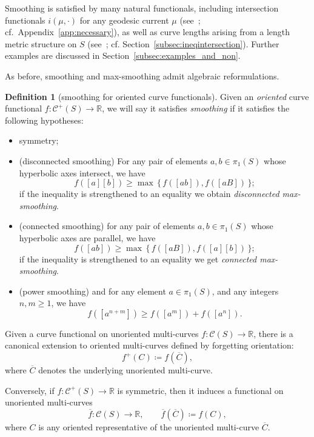 \documentclass[11pt]{amsart}
\numberwithin{equation}{section}
\numberwithin{figure}{section}
\theoremstyle{definition}
\newtheorem{definition}[theorem]{Definition}
\theoremstyle{plain}
\newcommand{\Curves}{\mathcal{C}}
\begin{document}
Smoothing is satisfied by many natural functionals, including
intersection functionals $i(\mu,\cdot)$ for any geodesic current $\mu$
(see~\cite[Section~4.1]{MGT21:Smoothings}; cf.~Appendix~\ref{app:necessary}),
as well as curve lengths arising from a length metric structure on $S$
(see~\cite[Section~4.3]{MGT21:Smoothings}; cf. Section~\ref{subsec:ineqintersection}).
Further examples are discussed in Section~\ref{subsec:examples_and_non}.

As before, smoothing and max-smoothing admit algebraic reformulations.

\begin{definition}[smoothing for oriented curve functionals]
 Given an \emph{oriented} curve functional $f \colon \Curves^+(S) \to \mathbb{R}$, we will say it satisfies \emph{smoothing} if it satisfies the following hypotheses:
\begin{itemize}
\item symmetry;
\item (disconnected smoothing) For any pair of
  elements $a,b \in \pi_1(S)$ whose hyperbolic axes intersect, we have 
  \[ f([a] [b]) \geq \max\,\{\,f([ab]), f([aB])\,\}; \] if the inequality is
  strengthened to an equality we obtain \emph{disconnected max-smoothing}.
\item (connected smoothing) for any pair of elements $a,b \in
  \pi_1(S)$ whose hyperbolic axes are parallel, we have
  \[ f([ab]) \geq \max\,\{\,f([aB]), f([a] [b])\,\}; \]
  if the inequality is
  strengthened to an equality we get \emph{connected max-smoothing}.
 \item (power smoothing) and for any element $a \in \pi_1(S)$, and any
  integers $n,m\geq 1$, we have \begin{equation} f([a^{n+m}]) \geq f([a^{ m}]) +
  f([a^{ n}]).\label{eq:power_smoothing_unoriented}\end{equation}
\end{itemize}
\label{def:smoothing_for_oriented}
\end{definition}

Given a curve functional on unoriented multi-curves
$f \colon \Curves(S) \to \mathbb{R}$, there is a canonical extension to
oriented multi-curves defined by forgetting orientation:
\[
f^+(C) \coloneqq f(\overline{C}),
\]
where $\overline{C}$ denotes the underlying unoriented multi-curve.

Conversely, if $f \colon \Curves^+(S) \to \mathbb{R}$ is symmetric, then it induces a functional on unoriented multi-curves
\[
\overline{f} \colon \Curves(S) \to \mathbb{R}, 
\qquad
\overline{f}(\overline{C}) \coloneqq f(C),
\]
where $C$ is any oriented representative of the unoriented
multi-curve $\overline{C}$.
\end{document}
